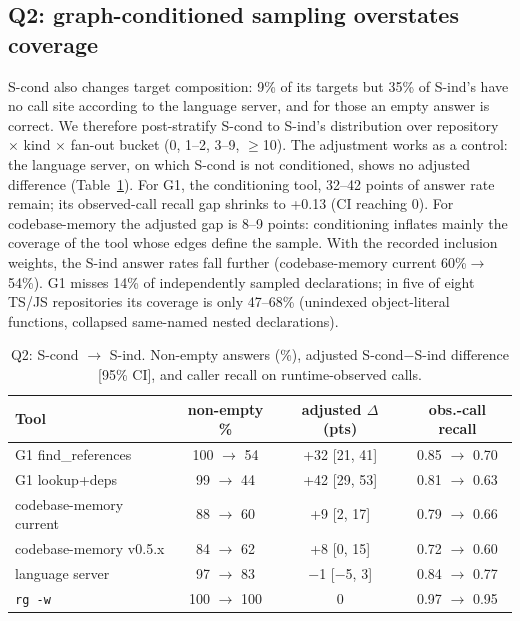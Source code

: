 \documentclass[conference]{IEEEtran}
\newcommand{\rg}{\texttt{rg\,-w}\xspace}
\newcommand{\cbm}{codebase-memory\xspace}
\begin{document}
\subsection{Q2: graph-conditioned sampling overstates coverage}
S-cond also changes target composition: 9\% of its targets but 35\% of S-ind's have no call site according to the language server, and for those an empty answer is correct.
We therefore post-stratify S-cond to S-ind's distribution over repository $\times$ kind $\times$ fan-out bucket (0, 1--2, 3--9, $\ge$10).
The adjustment works as a control: the language server, on which S-cond is not conditioned, shows no adjusted difference (Table~\ref{tab:q2}).
For G1, the conditioning tool, 32--42 points of answer rate remain; its observed-call recall gap shrinks to +0.13 (CI reaching 0).
For \cbm the adjusted gap is 8--9 points: conditioning inflates mainly the coverage of the tool whose edges define the sample.
With the recorded inclusion weights, the S-ind answer rates fall further (\cbm current 60\%$\rightarrow$54\%).
G1 misses 14\% of independently sampled declarations; in five of eight TS/JS repositories its coverage is only 47--68\% (unindexed object-literal functions, collapsed same-named nested declarations).

\begin{table}[t]
\centering
\caption{Q2: S-cond $\rightarrow$ S-ind. Non-empty answers (\%), adjusted S-cond$-$S-ind difference [95\% CI], and caller recall on runtime-observed calls.}
\label{tab:q2}
\setlength{\tabcolsep}{3pt}
\begin{tabular}{@{}lccc@{}}
\toprule
Tool & non-empty \% & adjusted $\Delta$ (pts) & obs.-call recall\\
\midrule
G1 find\_references & 100 $\rightarrow$ 54 & +32 [21, 41] & 0.85 $\rightarrow$ 0.70\\
G1 lookup+deps & \phantom{0}99 $\rightarrow$ 44 & +42 [29, 53] & 0.81 $\rightarrow$ 0.63\\
\cbm current & \phantom{0}88 $\rightarrow$ 60 & \phantom{0}+9 [2, 17] & 0.79 $\rightarrow$ 0.66\\
\cbm v0.5.x & \phantom{0}84 $\rightarrow$ 62 & \phantom{0}+8 [0, 15] & 0.72 $\rightarrow$ 0.60\\
language server & \phantom{0}97 $\rightarrow$ 83 & \phantom{0}$-$1 [$-$5, 3] & 0.84 $\rightarrow$ 0.77\\
\rg & 100 $\rightarrow$ 100 & \phantom{$-$}0 & 0.97 $\rightarrow$ 0.95\\
\bottomrule
\end{tabular}
\vspace{-1em}
\end{table}
\end{document}
